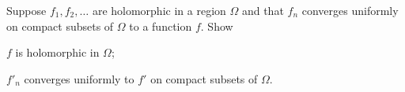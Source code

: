 Suppose $f_1,f_2,\ldots $ are holomorphic in a region $\Omega$ and
that $f_n$ converges uniformly on compact subsets of $\Omega$ to a
function $f$. Show
\begin{alist}
\item $f$ is holomorphic in $\Omega$;
\item $f'_n$ converges uniformly to $f'$ on compact subsets of $\Omega$.
\end{alist}
